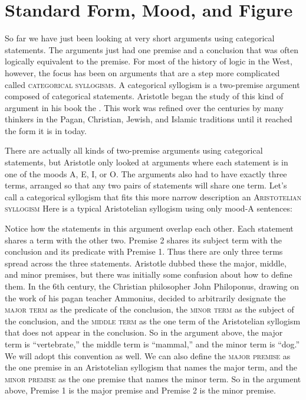 \section{Standard Form, Mood, and Figure}\label{sec:form_mood_figure}

So far we have just been looking at very short arguments using categorical statements. The arguments just had one premise and a conclusion that was often logically equivalent to the premise. For most of the history of logic in the West, however, the focus has been on arguments that are a step more complicated called \textsc{\glspl{categorical syllogism}}. A categorical syllogism is a two-premise argument composed of categorical statements. Aristotle began the study of this kind of argument in his book the \cite{Aristotle:prior}. This work was refined over the centuries by many thinkers in the Pagan, Christian, Jewish, and Islamic traditions until it reached the form it is in today.

There are actually all kinds of two-premise arguments using categorical statements, but Aristotle only looked at arguments where each statement is in one of the moods A, E, I, or O. The arguments also had to have exactly three terms, arranged so that any two pairs of statements will share one term. Let's call a categorical syllogism that fits this more narrow description an \textsc{\gls{Aristotelian syllogism}} Here is a typical Aristotelian syllogism using only mood-A sentences:

\begin{kormanize}
\end{kormanize}
\label{AAA_arg}


Notice how the statements in this argument overlap each other. Each statement shares a term with the other two. Premise 2 shares its subject term with the conclusion and its predicate with Premise 1. Thus there are only three terms spread across the three statements. Aristotle dubbed these the major, middle, and minor premises, but there was initially some confusion about how to define them. In the 6th century, the Christian philosopher John Philoponus, drawing on the work of his pagan teacher Ammonius, decided to arbitrarily designate the \textsc{\gls{major term}} as the predicate of the conclusion, the \textsc{\gls{minor term}} as the subject of the conclusion, and the \textsc{\gls{middle term}} as the one term of the Aristotelian syllogism that does not appear in the conclusion. So in the argument above, the major term is ``vertebrate,'' the middle term is ``mammal,'' and the minor term is ``dog.'' We will adopt this convention as well.
We can also define the \textsc{\gls{major premise}} as the one premise in an Aristotelian syllogism that names the major term, and the \textsc{\gls{minor premise}} as the one premise that names the minor term. So in the argument above, Premise 1 is the major premise and Premise 2 is the minor premise.


